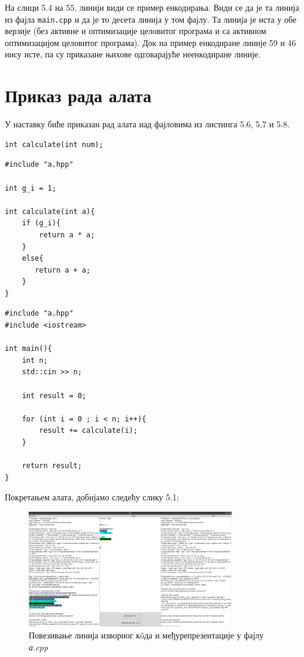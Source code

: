 \documentclass[12pt,oneside]{memoir}
\begin{document}
На слици 5.4 на 55. линији види се пример енкодирања. 
Види се да је та линија из фајла \texttt{main.cpp} и да је то десета линија у том фајлу.
Та линија је иста у обе верзије (без активне и оптимизације целовитог програма
и са активном оптимизацијом целовитог програма).
Док на пример енкодиране линије 59 и 46 нису исте, па су приказане њихове
 одговарајуће неенкодиране линије. 

\section{Приказ рада алата}

У наставку биће приказан рад алата над фајловима из листинга 5.6, 5.7 и 5.8.

\begin{lstlisting}[frame=single, caption=a.hpp, captionpos=b]
int calculate(int num);
\end{lstlisting}

\begin{lstlisting}[frame=single, caption=a.cpp, captionpos=b]
#include "a.hpp"

int g_i = 1;

int calculate(int a){
    if (g_i){
        return a * a;
    }
    else{
       return a + a;
    }  
}
\end{lstlisting}

\begin{lstlisting}[frame=single, caption=main.cpp, captionpos=b]
#include "a.hpp"
#include <iostream>

int main(){
    int n;
    std::cin >> n;
    
    int result = 0;

    for (int i = 0 ; i < n; i++){
        result += calculate(i);
    }

    return result;
}

\end{lstlisting}

Покретањем алата, добијамо следећу слику 5.1:

\begin{figure}[!ht]
  \centering
  \includegraphics[width=0.8\textwidth]{a_cpp.png}
  \caption{ Повезивање линија изворног к\^{o}да и међурепрезентације у фајлу \textit{а.cpp }  }
  \label{fig:grafikon}
\end{figure}
\end{document}
